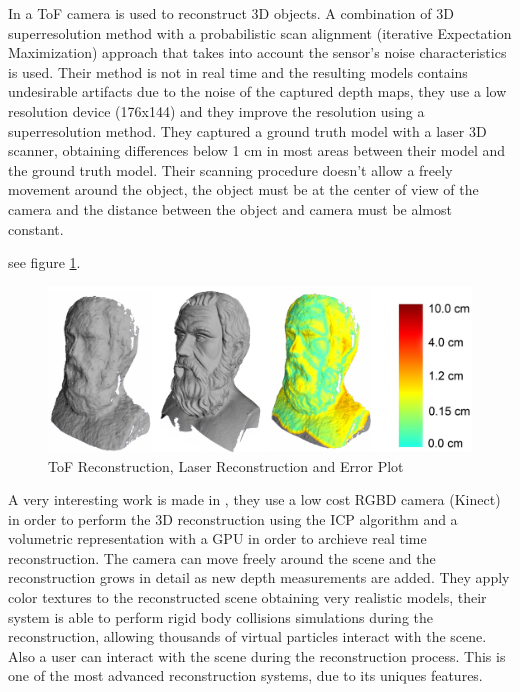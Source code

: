 In \cite{cui} a ToF camera is used to reconstruct 3D objects. A combination of 3D superresolution method with a 
probabilistic scan alignment (iterative Expectation Maximization) approach that takes into account the sensor's 
noise characteristics is used. Their method is not in real time and the resulting models contains undesirable 
artifacts due to  the noise of the captured depth maps, they use a low resolution device (176x144) and they 
improve the resolution using a superresolution method. They captured a ground truth model with a laser 3D scanner, 
obtaining differences below 1 cm in most areas between their model and the ground truth model. Their scanning 
procedure doesn't allow a freely movement around the object, the object must be at the center of view of the camera 
and the distance between the object and camera must be almost constant.
 
see figure \ref{fig:cui}.

\begin{figure}[h!]
\begin{center}
\includegraphics[scale=0.23]{images/cui}
\caption{ToF Reconstruction, Laser Reconstruction and Error Plot}
\label{fig:cui}
\end{center}
\end{figure}

 
A very interesting work is made in \cite{izadi}, they use a low cost RGBD camera (Kinect) in order to perform
the 3D reconstruction using the ICP algorithm  and a volumetric representation with a GPU in order to 
archieve real time reconstruction. The camera can move freely around the scene and the reconstruction grows in detail 
as new depth measurements are added. They apply color textures to the reconstructed scene obtaining very 
realistic models, their system is able to perform rigid body collisions 
simulations during the reconstruction, allowing thousands of virtual particles interact with the scene. Also a 
user can interact with the scene during the reconstruction process. This is one of the most advanced 
reconstruction systems, due to its uniques features.

